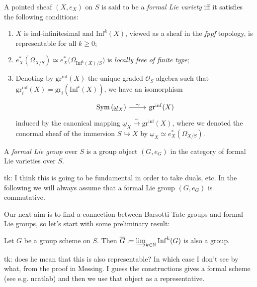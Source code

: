 \documentclass[../Main]{subfiles}
\begin{document}
\begin{defn}
	A pointed sheaf $\left(X, e_X\right)$ on $S$ is said to be
	a {\em formal Lie variety} iff it satisfies the following conditions:
\begin{enumerate}
	\item $X$ is ind-infinitesimal and $\mathrm{Inf}^k(X)$, viewed
		as a sheaf in the {\em fppf} topology,
		is representable for all $k \geq 0$;
	\item $e_X^* \left( \Omega_{X/S} \right) \simeq
		e_X^* \big( \Omega_{\mathrm{Inf}^k(X)/S} \big)$
		is {\em locally free of finite type};
	\item Denoting by $\mathrm{gr}^{\mathrm{inf}}(X)$ the unique graded $\mathcal{O}_{ S }$-algebra
		such that $\mathrm{gr}^{\mathrm{inf}}_i(X) = \mathrm{gr}_i(\mathrm{Inf}^i(X))$,
		we have an isomorphism
		\begin{equation*}
		\begin{tikzcd}[row sep = 0ex
			,/tikz/column 1/.append style={anchor=base east}
			,/tikz/column 2/.append style={anchor=base west}]
		\mathrm{Sym}\left( \underline{\omega}_X \right) \arrow[r, "\sim", rightarrow] &
				\mathrm{gr}^{\mathrm{inf}}(X)
		\end{tikzcd}
		\end{equation*} 
		induced by the canonical mapping
		$\underline{\omega}_X \xrightarrow{\sim} \mathrm{gr}^{\mathrm{inf}}(X)$,
		where we denoted the conormal sheaf of the immersion $S \hookrightarrow X$
		by $\underline{\omega}_X \simeq e^*_X \left( \Omega_{X/S} \right)$.
\end{enumerate}
\end{defn}


\begin{defn}
	A {\em formal Lie group} over $S$ is a group object $\left(G, e_G\right)$
	in the category of formal Lie varieties over $S$.
\end{defn}
tk: I think this is going to be fundamental in order to take duals, etc.
In the following we will always assume that a formal Lie group $\left(G, e_G\right)$ 
is commutative.

Our next aim is to find a connection between Barsotti-Tate groups and formal Lie groups,
so let's start with some preliminary result:
\begin{lem}
	Let $G$ be a group scheme on $S$.
	Then $\overline{G} \coloneqq \varinjlim_{k \in \mathbb{N}} \mathrm{Inf}^k(G)$
	is also a group.
\end{lem} 
tk: does he mean that this is also representable? In which case I don't see by what,
from the proof in Messing.
I guess the constructions gives a formal scheme (see e.g. ncatlab) and then we use that object
as a representative.
\end{document}
